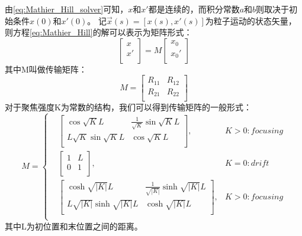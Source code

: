 由\ref{eq:Mathier_Hill_solver}可知，$x$和$x'$都是连续的，而积分常数$a$和$b$则取决于初始条件$x(0)$和$x'(0)$。
记$\vec{x}(s)=[x(s),x'(s)]$为粒子运动的状态矢量，则方程\ref{eq:Mathier_Hill}的解可以表示为矩阵形式：
\begin{equation}
    \label{eq:Mathier_Hill_solver_matrix}
    \begin{bmatrix}
      x   \\
      x'  \\
    \end{bmatrix}
    =
    M
    \begin{bmatrix}
      x_0   \\
      x_0'  \\
    \end{bmatrix}
\end{equation}
其中M叫做传输矩阵：
\begin{equation}
    \label{eq:Mathier_Hill_tranfermap}
    M=
    \begin{bmatrix}
      R_{11} & R_{12}  \\
      R_{21} & R_{22}  \\
    \end{bmatrix}
\end{equation}
对于聚焦强度K为常数的结构，我们可以得到传输矩阵的一般形式：
\begin{equation}
    \label{eq:Mathier_Hill_tranfermap_K}
    M=\left\{
    \begin{aligned}
        &\begin{bmatrix}
          \cos \sqrt{K}L                & \frac{1}{\sqrt{K}} \sin \sqrt{K}L  \\
          L{\sqrt{K}} \sin \sqrt{K}L    & \cos \sqrt{K}L   \\
        \end{bmatrix}
        ,& K>0:focusing  \\
        &\begin{bmatrix}
          1 & L  \\
          0 & 1  \\
        \end{bmatrix}
        ,& K=0:drift  \\
        &\begin{bmatrix}
          \cosh \sqrt{|K|}L                & \frac{1}{\sqrt{|K|}} \sinh \sqrt{|K|}L  \\
          L{\sqrt{|K|}} \sinh \sqrt{|K|}L    & \cosh \sqrt{|K|}L   \\
        \end{bmatrix}
        ,& K>0:focusing  \\
    \end{aligned}
    \right.
\end{equation}
其中L为初位置和末位置之间的距离。

